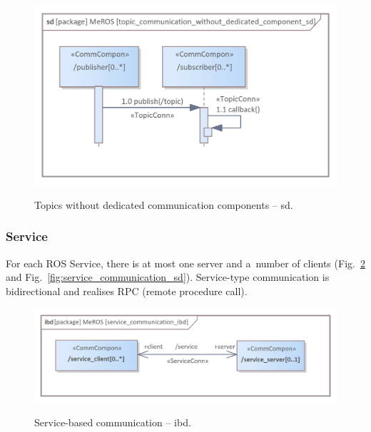 \documentclass[11pt,oneside,a4paper]{article}
\begin{document}
	\begin{figure}[H]
		\centering
		\begin{center}
			{\includegraphics[scale=1.0]{img/meros_pkg/topic_communication_without_dedicated_component_sd.png}}
		\end{center}
		\caption{Topics without dedicated communication components -- sd.} 
		\label{fig:topic_communication_without_dedicated_component_sd}
	\end{figure}
	
\subsubsection{Service}
\label{sec:metamodel-service}
	
	For each ROS Service, there is at most one server and a~number of clients (Fig.~\ref{fig:service_communication_ibd} and Fig.~\ref{fig:service_communication_sd}). Service-type communication is bidirectional and realises RPC (remote procedure call).
	

	\begin{figure}[H]
		\centering
		\begin{center}
			{\includegraphics[scale=1.0]{img/meros_pkg/service_communication_ibd.png}}
		\end{center}
		\caption{Service-based communication -- ibd.} 
		\label{fig:service_communication_ibd}
	\end{figure}
	
\end{document}
